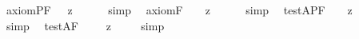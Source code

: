 \begin{isabellebody}
%
\endisadelimproof
\isanewline
\isanewline
{}\isamarkupfalse%
\ axiom{\isacharunderscore}{}{\isacharunderscore}PF{\isacharcolon}\ {\isachardoublequoteopen}{\isacharbrackleft}{\isasymdiamond}\ {\isacharcomma}{\isasymphi}{\isacharcomma}\ {\isasymrightarrow}\isactrlsup z\ {\isasymbox}\ {\isacharparenleft}{\isasymdiamond}\ {\isacharcomma}{\isasymphi}{\isacharcomma}{\isacharparenright}{\isacharbrackright}{\isachardoublequoteclose}%
\isadelimproof
\ %
\endisadelimproof
%
\isatagproof
{}\isamarkupfalse%
\ simp\ \isamarkupfalse%
%
\endisatagproof
{\isafoldproof}%
%
\isadelimproof
%
\endisadelimproof
\isanewline
{}\isamarkupfalse%
\ axiom{\isacharunderscore}{}{\isacharunderscore}F{\isacharcolon}\ \ {\isachardoublequoteopen}{\isacharbrackleft}{\isasymdiamond}\ {\isacharsemicolon}{\isasymphi}{\isacharsemicolon}\ {\isasymrightarrow}\isactrlsup z\ {\isasymbox}\ {\isacharparenleft}{\isasymdiamond}\ {\isacharsemicolon}{\isasymphi}{\isacharsemicolon}{\isacharparenright}{\isacharbrackright}{\isachardoublequoteclose}%
\isadelimproof
\ %
\endisadelimproof
%
\isatagproof
{}\isamarkupfalse%
\ simp\ \isamarkupfalse%
%
\endisatagproof
{\isafoldproof}%
%
\isadelimproof
%
\endisadelimproof
\isanewline
\isanewline
\isanewline
{}\isamarkupfalse%
\ test{\isacharunderscore}A{\isacharunderscore}PF{\isacharcolon}\ {\isachardoublequoteopen}{\isacharbrackleft}{\isasymbox}\ {\isacharparenleft}{\isasymdiamond}\ {\isacharcomma}{\isasymphi}{\isacharcomma}{\isacharparenright}\ {\isasymrightarrow}\isactrlsup z\ {\isasymdiamond}\ {\isacharcomma}{\isasymphi}{\isacharcomma}{\isacharbrackright}{\isachardoublequoteclose}%
\isadelimproof
\ %
\endisadelimproof
%
\isatagproof
{}\isamarkupfalse%
\ simp\ \isamarkupfalse%
%
\endisatagproof
{\isafoldproof}%
%
\isadelimproof
%
\endisadelimproof
\isanewline
{}\isamarkupfalse%
\ test{\isacharunderscore}A{\isacharunderscore}F{\isacharcolon}\ \ {\isachardoublequoteopen}{\isacharbrackleft}{\isasymbox}\ {\isacharparenleft}{\isasymdiamond}\ {\isacharsemicolon}{\isasymphi}{\isacharsemicolon}{\isacharparenright}\ {\isasymrightarrow}\isactrlsup z\ {\isasymdiamond}\ {\isacharsemicolon}{\isasymphi}{\isacharsemicolon}{\isacharbrackright}{\isachardoublequoteclose}%
\isadelimproof
\ %
\endisadelimproof
%
\isatagproof
{}\isamarkupfalse%
\ simp\ \isamarkupfalse%
%
\endisatagproof
{\isafoldproof}%
%
\isadelimproof
%
\endisadelimproof
\isanewline
\isanewline

\end{isabellebody}

